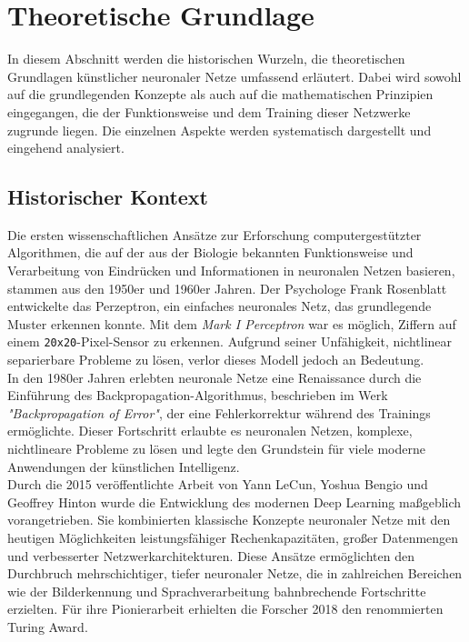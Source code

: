 \documentclass[a4paper, 12pt]{article}
\begin{document}
\newpage %

\section{Theoretische Grundlage}\label{chapter..2}
In diesem Abschnitt werden die historischen Wurzeln, die theoretischen Grundlagen künstlicher 
neuronaler Netze umfassend erläutert. Dabei wird sowohl auf die grundlegenden Konzepte als auch 
auf die mathematischen Prinzipien eingegangen, die der Funktionsweise und dem Training dieser 
Netzwerke zugrunde liegen. Die einzelnen Aspekte werden systematisch dargestellt und eingehend 
analysiert.

\subsection{Historischer Kontext}\label{chapter..2.1}
Die ersten wissenschaftlichen Ansätze zur Erforschung computergestützter Algorithmen, die auf der 
aus der Biologie bekannten Funktionsweise und Verarbeitung von Eindrücken und Informationen in 
neuronalen Netzen basieren, stammen aus den 1950er und 1960er Jahren. Der Psychologe Frank 
Rosenblatt entwickelte das Perzeptron, ein einfaches neuronales Netz, das grundlegende Muster 
erkennen konnte. Mit dem \textit{Mark I Perceptron} war es möglich, Ziffern auf einem 
\texttt{20x20}-Pixel-Sensor zu erkennen. Aufgrund seiner Unfähigkeit, nichtlinear separierbare 
Probleme zu lösen, verlor dieses Modell jedoch an Bedeutung.\cite{kriesel2007kleiner}\\
In den 1980er Jahren erlebten neuronale Netze eine Renaissance durch die Einführung des 
Backpropagation-Algorithmus, beschrieben im Werk \textit{"Backpropagation of Error"}, der eine 
Fehlerkorrektur während des Trainings ermöglichte. Dieser Fortschritt erlaubte es neuronalen Netzen, 
komplexe, nichtlineare Probleme zu lösen und legte den Grundstein für viele moderne Anwendungen der 
künstlichen Intelligenz.\cite{kriesel2007kleiner}\\
Durch die 2015 veröffentlichte Arbeit von Yann LeCun, Yoshua Bengio und Geoffrey Hinton wurde die 
Entwicklung des modernen Deep Learning maßgeblich vorangetrieben.\cite{lecun2015deep} Sie 
kombinierten klassische Konzepte neuronaler Netze mit den heutigen Möglichkeiten leistungsfähiger 
Rechenkapazitäten, großer Datenmengen und verbesserter Netzwerkarchitekturen. Diese Ansätze 
ermöglichten den Durchbruch mehrschichtiger, tiefer neuronaler Netze, die in zahlreichen Bereichen 
wie der Bilderkennung und Sprachverarbeitung bahnbrechende Fortschritte erzielten. Für ihre 
Pionierarbeit erhielten die Forscher 2018 den renommierten Turing Award.
\end{document}

